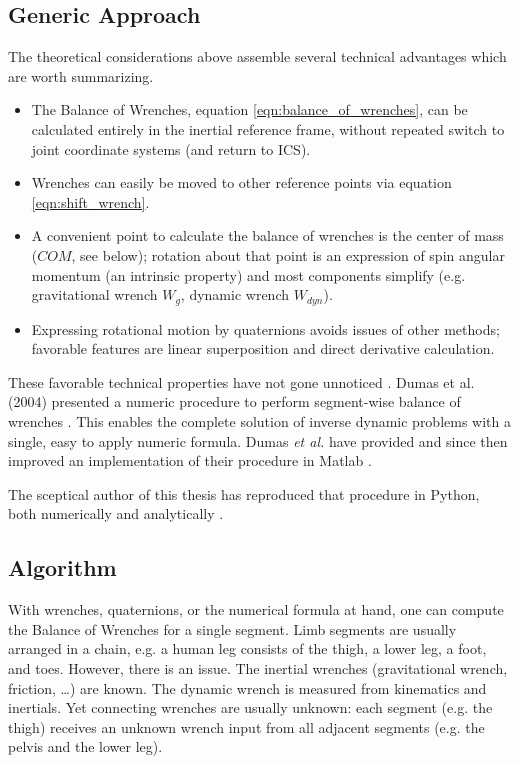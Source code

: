 \subsection{Generic Approach}
\label{sec:org376ad0f}
The theoretical considerations above assemble several technical advantages which are worth summarizing.
\begin{itemize}
\item The Balance of Wrenches, equation \eqref{eqn:balance_of_wrenches}, can be calculated entirely in the inertial reference frame, without repeated switch to joint coordinate systems (and return to ICS).
\item Wrenches can easily be moved to other reference points via equation \eqref{eqn:shift_wrench}.
\item A convenient point to calculate the balance of wrenches is the center of mass (\(COM\), see below); rotation about that point is an expression of spin angular momentum (an intrinsic property) and most components simplify (e.g. gravitational wrench \(W_{g}\), dynamic wrench \(W_{dyn}\)).
\item Expressing rotational motion by quaternions avoids issues of other methods; favorable features are linear superposition and direct derivative calculation.
\end{itemize}

These favorable technical properties have not gone unnoticed \citep{Dumas2004,Dumas2007}.
Dumas et al. (2004) presented a numeric procedure to perform segment-wise balance of wrenches \citep[equation 15 in][]{Dumas2004}.
This enables the complete solution of inverse dynamic problems with a single, easy to apply numeric formula.
Dumas \emph{et al.} have provided and since then improved an implementation of their procedure in Matlab \citep{DumasMatlab}.


The sceptical author of this thesis has reproduced that procedure in Python, both numerically and analytically \citep{Mielke2021id}.


\subsection{Algorithm}
\label{sec:org56ce9e3}
With wrenches, quaternions, or the numerical formula at hand, one can compute the Balance of Wrenches for a single segment.
Limb segments are usually arranged in a chain, e.g. a human leg consists of the thigh, a lower leg, a foot, and toes.
However, there is an issue.
The inertial wrenches (gravitational wrench, friction, \ldots{}) are known.
The dynamic wrench is measured from kinematics and inertials.
Yet connecting wrenches are usually unknown: each segment (e.g. the thigh) receives an unknown wrench input from all adjacent segments (e.g. the pelvis and the lower leg).

